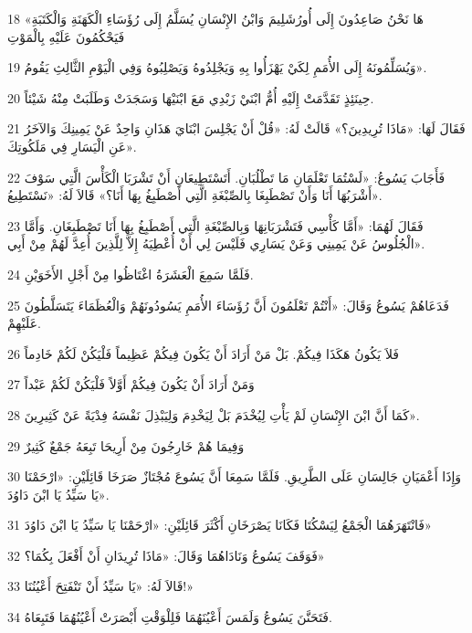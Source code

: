 \par 18 «هَا نَحْنُ صَاعِدُونَ إِلَى أُورُشَلِيمَ وَابْنُ الإِنْسَانِ يُسَلَّمُ إِلَى رُؤَسَاءِ الْكَهَنَةِ وَالْكَتَبَةِ فَيَحْكُمُونَ عَلَيْهِ بِالْمَوْتِ
\par 19 وَيُسَلِّمُونَهُ إِلَى الأُمَمِ لِكَيْ يَهْزَأُوا بِهِ وَيَجْلِدُوهُ وَيَصْلِبُوهُ وَفِي الْيَوْمِ الثَّالِثِ يَقُومُ».
\par 20 حِينَئِذٍ تَقَدَّمَتْ إِلَيْهِ أُمُّ ابْنَيْ زَبْدِي مَعَ ابْنَيْهَا وَسَجَدَتْ وَطَلَبَتْ مِنْهُ شَيْئاً.
\par 21 فَقَالَ لَهَا: «مَاذَا تُرِيدِينَ؟» قَالَتْ لَهُ: «قُلْ أَنْ يَجْلِسَ ابْنَايَ هَذَانِ وَاحِدٌ عَنْ يَمِينِكَ وَالآخَرُ عَنِ الْيَسَارِ فِي مَلَكُوتِكَ».
\par 22 فَأَجَابَ يَسُوعُ: «لَسْتُمَا تَعْلَمَانِ مَا تَطْلُبَانِ. أَتَسْتَطِيعَانِ أَنْ تَشْرَبَا الْكَأْسَ الَّتِي سَوْفَ أَشْرَبُهَا أَنَا وَأَنْ تَصْطَبِغَا بِالصِّبْغَةِ الَّتِي أَصْطَبِغُ بِهَا أَنَا؟» قَالاَ لَهُ: «نَسْتَطِيعُ».
\par 23 فَقَالَ لَهُمَا: «أَمَّا كَأْسِي فَتَشْرَبَانِهَا وَبِالصِّبْغَةِ الَّتِي أَصْطَبِغُ بِهَا أَنَا تَصْطَبِغَانِ. وَأَمَّا الْجُلُوسُ عَنْ يَمِينِي وَعَنْ يَسَارِي فَلَيْسَ لِي أَنْ أُعْطِيَهُ إِلاَّ لِلَّذِينَ أُعِدَّ لَهُمْ مِنْ أَبِي».
\par 24 فَلَمَّا سَمِعَ الْعَشَرَةُ اغْتَاظُوا مِنْ أَجْلِ الأَخَوَيْنِ.
\par 25 فَدَعَاهُمْ يَسُوعُ وَقَالَ: «أَنْتُمْ تَعْلَمُونَ أَنَّ رُؤَسَاءَ الأُمَمِ يَسُودُونَهُمْ وَالْعُظَمَاءَ يَتَسَلَّطُونَ عَلَيْهِمْ.
\par 26 فَلاَ يَكُونُ هَكَذَا فِيكُمْ. بَلْ مَنْ أَرَادَ أَنْ يَكُونَ فِيكُمْ عَظِيماً فَلْيَكُنْ لَكُمْ خَادِماً
\par 27 وَمَنْ أَرَادَ أَنْ يَكُونَ فِيكُمْ أَوَّلاً فَلْيَكُنْ لَكُمْ عَبْداً
\par 28 كَمَا أَنَّ ابْنَ الإِنْسَانِ لَمْ يَأْتِ لِيُخْدَمَ بَلْ لِيَخْدِمَ وَلِيَبْذِلَ نَفْسَهُ فِدْيَةً عَنْ كَثِيرِينَ».
\par 29 وَفِيمَا هُمْ خَارِجُونَ مِنْ أَرِيحَا تَبِعَهُ جَمْعٌ كَثِيرٌ
\par 30 وَإِذَا أَعْمَيَانِ جَالِسَانِ عَلَى الطَّرِيقِ. فَلَمَّا سَمِعَا أَنَّ يَسُوعَ مُجْتَازٌ صَرَخَا قَائِلَيْنِ: «ارْحَمْنَا يَا سَيِّدُ يَا ابْنَ دَاوُدَ».
\par 31 فَانْتَهَرَهُمَا الْجَمْعُ لِيَسْكُتَا فَكَانَا يَصْرَخَانِ أَكْثَرَ قَائِلَيْنِ: «ارْحَمْنَا يَا سَيِّدُ يَا ابْنَ دَاوُدَ»
\par 32 فَوَقَفَ يَسُوعُ وَنَادَاهُمَا وَقَالَ: «مَاذَا تُرِيدَانِ أَنْ أَفْعَلَ بِكُمَا؟»
\par 33 قَالاَ لَهُ: «يَا سَيِّدُ أَنْ تَنْفَتِحَ أَعْيُنُنَا!»
\par 34 فَتَحَنَّنَ يَسُوعُ وَلَمَسَ أَعْيُنَهُمَا فَلِلْوَقْتِ أَبْصَرَتْ أَعْيُنُهُمَا فَتَبِعَاهُ.

